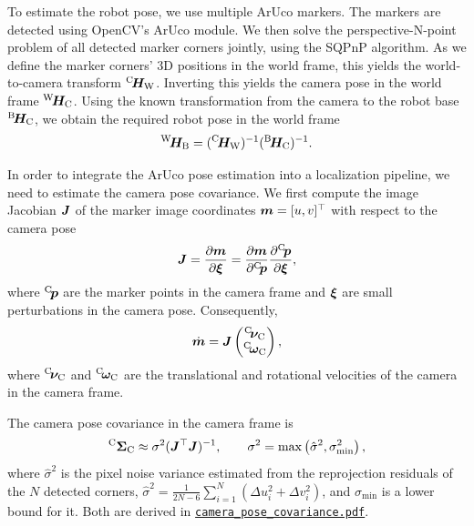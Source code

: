 \documentclass{article}
\newenvironment{added}
  {\par\noindent\begin{lrbox}{\addedbox}\begin{minipage}{\dimexpr\linewidth-2\fboxsep\relax}}
  {\end{minipage}\end{lrbox}\colorbox{addedcolor}{\usebox{\addedbox}}\par}
\begin{document}
To estimate the robot pose, we use multiple ArUco markers. The markers are detected using OpenCV's ArUco module. We then solve the perspective-N-point problem of all detected marker corners jointly, using the SQPnP algorithm. As we define the marker corners' 3D positions in the world frame, this yields the world-to-camera transform ${}^{\mathrm{C}}\! \bm{H}_{\mathrm{W}}$. Inverting this yields the camera pose in the world frame ${}^{\mathrm{W}}\! \bm{H}_{\mathrm{C}}$. Using the known transformation from the camera to the robot base ${}^{\mathrm{B}}\! \bm{H}_{\mathrm{C}}$, we obtain the required robot pose in the world frame
\[
{}^{\mathrm{W}}\! \bm{H}_{\mathrm{B}} = ({}^{\mathrm{C}}\! \bm{H}_{\mathrm{W}})^{-1} ({}^{\mathrm{B}}\! \bm{H}_{\mathrm{C}})^ {-1}.
\]

In order to integrate the ArUco pose estimation into a localization pipeline, we need to estimate the camera pose covariance. We first compute the image Jacobian $\bm{J}$ of the marker image coordinates $\bm{m} = [u, v]^\top$ with respect to the camera pose
\[
\bm{J} = \frac{\partial \bm{m}}{\partial \bm{\xi}} = \frac{\partial \bm{m}}{\partial {}^{\mathrm{C}}\! \bm{p}} \frac{\partial {}^{\mathrm{C}}\! \bm{p}}{\partial \bm{\xi}},
\]
where ${}^{\mathrm{C}}\! \bm{p}$ are the marker points in the camera frame and $\bm{\xi}$ are small perturbations in the camera pose. Consequently,
\[
\dot{\bm{m}} = \bm{J} \begin{pmatrix} {}^{\mathrm{C}}\! \bm{\nu}_{\mathrm{C}} \\ {}^{\mathrm{C}}\! \bm{\omega}_{\mathrm{C}} \end{pmatrix},
\]
where ${}^{\mathrm{C}}\! \bm{\nu}_{\mathrm{C}}$ and ${}^{\mathrm{C}}\! \bm{\omega}_{\mathrm{C}}$ are the translational and rotational velocities of the camera in the camera frame.
\begin{added}
The camera pose covariance in the camera frame is
\[
{}^{\mathrm{C}} \bm{\Sigma}_{\mathrm{C}} \approx \sigma^2 (\bm{J}^\top \bm{J})^{-1}, \qquad \sigma^2 = \max\left(\hat\sigma^2, \sigma_\mathrm{min}^2\right),
\]
where $\hat\sigma^2$ is the pixel noise variance estimated from the reprojection residuals of the $N$ detected corners, $\hat\sigma^2 = \frac{1}{2N - 6} \sum_{i=1}^{N} (\Delta u_i^2 + \Delta v_i^2)$, and $\sigma_\mathrm{min}$ is a lower bound for it.
Both are derived in \href{camera_pose_covariance.pdf}{\texttt{camera\_pose\_covariance.pdf}}.
\end{added}
\end{document}
